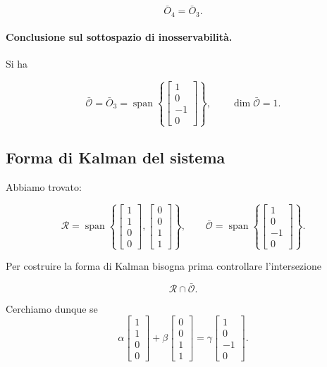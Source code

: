 \[
\bar O_4 = \bar O_3.
\]

\paragraph{Conclusione sul sottospazio di inosservabilità.}
Si ha

\[
\bar{\mathcal O}
=
\bar O_3
=
\operatorname{span}\left\{
\begin{bmatrix}
1\\0\\-1\\0
\end{bmatrix}
\right\},
\qquad
\dim \bar{\mathcal O}=1.
\]

\bigskip

\subsection{Forma di Kalman del sistema}

Abbiamo trovato:

\[
\mathcal R
=
\operatorname{span}\left\{
\begin{bmatrix}
1\\1\\0\\0
\end{bmatrix},
\begin{bmatrix}
0\\0\\1\\1
\end{bmatrix}
\right\},
\qquad
\bar{\mathcal O}
=
\operatorname{span}\left\{
\begin{bmatrix}
1\\0\\-1\\0
\end{bmatrix}
\right\}.
\]

Per costruire la forma di Kalman bisogna prima controllare l'intersezione

\[
\mathcal R\cap\bar{\mathcal O}.
\]

Cerchiamo dunque se
\[
\alpha
\begin{bmatrix}
1\\1\\0\\0
\end{bmatrix}
+
\beta
\begin{bmatrix}
0\\0\\1\\1
\end{bmatrix}
=
\gamma
\begin{bmatrix}
1\\0\\-1\\0
\end{bmatrix}.
\]

